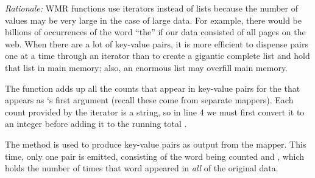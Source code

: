 \documentclass[letterpaper,10pt,openany,oneside]{sphinxmanual}
\begin{document}
\emph{Rationale:} WMR  functions use iterators instead of
lists because the number of values may be very large in the case of
large data. For example, there would be billions of occurrences of
the word ``the'' if our data consisted of all pages on the web. When
there are a lot of key-value pairs, it is more efficient to
dispense pairs one at a time through an iterator than to create a
gigantic complete list and hold that list in main memory; also, an
enormous list may overfill main memory.

The  function adds up all the counts that appear in
key-value pairs for the  that appears as `s
first argument (recall these come from separate mappers). Each
count provided by the iterator  is a string, so in line 4
we must first convert it to an integer before adding it to the
running total .

The method  is used to produce key-value pairs as
output from the mapper. This time, only one pair is emitted,
consisting of the word being counted and , which holds the
number of times that word appeared in \emph{all} of the original data.
\end{document}
